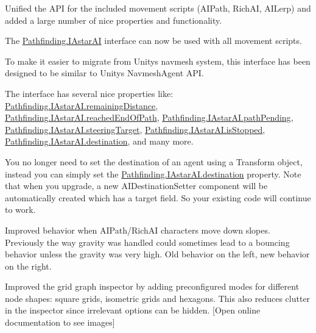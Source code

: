 \begin{DoxyItemize}
\begin{DoxyItemize}
\begin{DoxyItemize}
\item Unified the A\+PI for the included movement scripts (A\+I\+Path, Rich\+AI, A\+I\+Lerp) and added a large number of nice properties and functionality.
\begin{DoxyItemize}
\item The \mbox{\hyperlink{interface_pathfinding_1_1_i_astar_a_i}{Pathfinding.\+I\+Astar\+AI}} interface can now be used with all movement scripts.
\item To make it easier to migrate from Unity\textquotesingle{}s navmesh system, this interface has been designed to be similar to Unity\textquotesingle{}s Navmesh\+Agent A\+PI.
\item The interface has several nice properties like\+: \mbox{\hyperlink{interface_pathfinding_1_1_i_astar_a_i_a912fe97ee873d1e4a8bdb2217b72fb6c}{Pathfinding.\+I\+Astar\+A\+I.\+remaining\+Distance}}, \mbox{\hyperlink{interface_pathfinding_1_1_i_astar_a_i_a0b4009cade4a25ddc760cacb6669805e}{Pathfinding.\+I\+Astar\+A\+I.\+reached\+End\+Of\+Path}}, \mbox{\hyperlink{interface_pathfinding_1_1_i_astar_a_i_a8be62f7eda28b4111a46484248546e19}{Pathfinding.\+I\+Astar\+A\+I.\+path\+Pending}}, \mbox{\hyperlink{interface_pathfinding_1_1_i_astar_a_i_adcdddcb7dfcaa7350c94a0ffd9d3532d}{Pathfinding.\+I\+Astar\+A\+I.\+steering\+Target}}, \mbox{\hyperlink{interface_pathfinding_1_1_i_astar_a_i_adaf2a74d7f7e08c86987b969431304fb}{Pathfinding.\+I\+Astar\+A\+I.\+is\+Stopped}}, \mbox{\hyperlink{interface_pathfinding_1_1_i_astar_a_i_a8e9b0c66a663e23b11e7466f6d5ffca3}{Pathfinding.\+I\+Astar\+A\+I.\+destination}}, and many more.
\item You no longer need to set the destination of an agent using a Transform object, instead you can simply set the \mbox{\hyperlink{interface_pathfinding_1_1_i_astar_a_i_a8e9b0c66a663e23b11e7466f6d5ffca3}{Pathfinding.\+I\+Astar\+A\+I.\+destination}} property. Note that when you upgrade, a new A\+I\+Destination\+Setter component will be automatically created which has a \textquotesingle{}target\textquotesingle{} field. So your existing code will continue to work.
\end{DoxyItemize}
\item Improved behavior when A\+I\+Path/\+Rich\+AI characters move down slopes. Previously the way gravity was handled could sometimes lead to a \textquotesingle{}bouncing\textquotesingle{} behavior unless the gravity was very high. Old behavior on the left, new behavior on the right. 
\item Improved the grid graph inspector by adding preconfigured modes for different node shapes\+: square grids, isometric grids and hexagons. This also reduces clutter in the inspector since irrelevant options can be hidden. \mbox{[}Open online documentation to see images\mbox{]}

\end{DoxyItemize}
\end{DoxyItemize}
\end{DoxyItemize}

